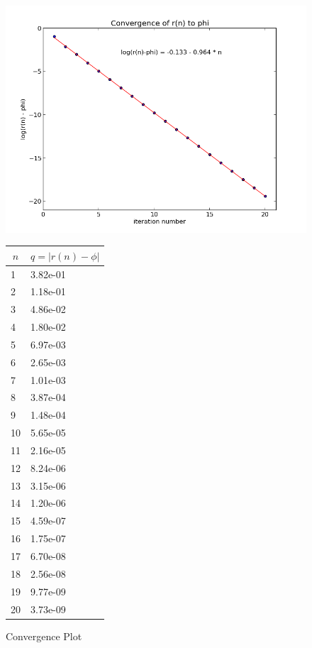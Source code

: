 \documentclass[aps,letterpaper,10pt]{article}
\begin{document}
\begin{figure}[!h]
\begin{minipage}[!h]{.85\linewidth}
\centering
\includegraphics[width=.85\textwidth]{P2/output.png}
\caption{Convergence Plot}
\label{fig: convergence}
\end{minipage}
\begin{minipage}[!h]{.14\linewidth}
\begin{tabular}{|l|l|}
\multicolumn{1}{c}{$n$} & 
\multicolumn{1}{c}{$q = |r(n)-\phi|$} \\
\hline
1 & 3.82e-01 \\
\hline
2 & 1.18e-01 \\
\hline
3 & 4.86e-02 \\
\hline
4 & 1.80e-02 \\
\hline
5 & 6.97e-03 \\
\hline
6 & 2.65e-03 \\
\hline
7 & 1.01e-03 \\
\hline
8 & 3.87e-04 \\
\hline
9 & 1.48e-04 \\
\hline
10 & 5.65e-05 \\
\hline
11 & 2.16e-05 \\
\hline
12 & 8.24e-06 \\
\hline
13 & 3.15e-06 \\
\hline
14 & 1.20e-06 \\
\hline
15 & 4.59e-07 \\
\hline
16 & 1.75e-07 \\
\hline
17 & 6.70e-08 \\
\hline
18 & 2.56e-08 \\
\hline
19 & 9.77e-09 \\
\hline
20 & 3.73e-09 \\
\hline
\end{tabular}
\end{minipage}
\end{figure}
\end{document}
